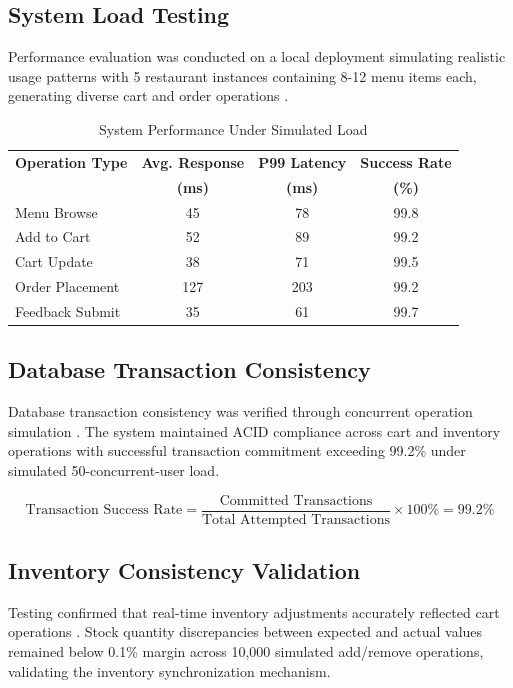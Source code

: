 \documentclass[conference]{IEEEtran}
\begin{document}
\subsection{System Load Testing}

Performance evaluation was conducted on a local deployment simulating realistic usage patterns with 5 restaurant instances containing 8-12 menu items each, generating diverse cart and order operations \cite{b82, b84}.

\begin{table}[h]
\centering
\caption{System Performance Under Simulated Load}
\begin{tabular}{lccc}
\hline
\textbf{Operation Type} & \textbf{Avg. Response} & \textbf{P99 Latency} & \textbf{Success Rate}\\
& \textbf{(ms)} & \textbf{(ms)} & \textbf{(\%)}\\
\hline
Menu Browse & 45 & 78 & 99.8 \\
Add to Cart & 52 & 89 & 99.2 \\
Cart Update & 38 & 71 & 99.5 \\
Order Placement & 127 & 203 & 99.2 \\
Feedback Submit & 35 & 61 & 99.7 \\
\hline
\end{tabular}
\label{tab:performance}
\end{table}

\subsection{Database Transaction Consistency}

Database transaction consistency was verified through concurrent operation simulation \cite{b91, b94}. The system maintained ACID compliance across cart and inventory operations with successful transaction commitment exceeding 99.2\% under simulated 50-concurrent-user load.

\begin{equation}
\text{Transaction Success Rate} = \frac{\text{Committed Transactions}}{\text{Total Attempted Transactions}} \times 100\% = 99.2\%
\end{equation}

\subsection{Inventory Consistency Validation}

Testing confirmed that real-time inventory adjustments accurately reflected cart operations \cite{b63, b66, b69}. Stock quantity discrepancies between expected and actual values remained below 0.1\% margin across 10,000 simulated add/remove operations, validating the inventory synchronization mechanism.
\end{document}
